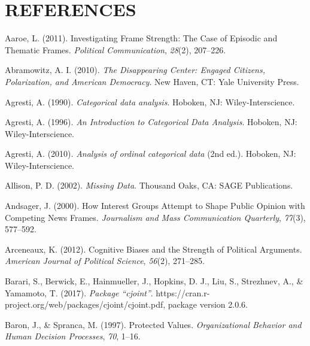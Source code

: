 \documentclass[12pt,econ]{sources/authesis}
\begin{document}
\hypertarget{references}{%
\chapter*{REFERENCES}\label{references}}

\noindent

\ssp

\hypertarget{refs}{}
\leavevmode\hypertarget{ref-aaroe_investigating_2011}{}%
Aaroe, L. (2011). Investigating Frame Strength: The Case of Episodic and Thematic Frames. \emph{Political Communication}, \emph{28}(2), 207--226.

\leavevmode\hypertarget{ref-abramowitz_disappearing_2010}{}%
Abramowitz, A. I. (2010). \emph{The Disappearing Center: Engaged Citizens, Polarization, and American Democracy}. New Haven, CT: Yale University Press.

\leavevmode\hypertarget{ref-agresti_1990_categorical}{}%
Agresti, A. (1990). \emph{Categorical data analysis}. Hoboken, NJ: Wiley-Interscience.

\leavevmode\hypertarget{ref-agresti_1996_introduction}{}%
Agresti, A. (1996). \emph{An Introduction to Categorical Data Analysis}. Hoboken, NJ: Wiley-Interscience.

\leavevmode\hypertarget{ref-agresti_2010_analysis}{}%
Agresti, A. (2010). \emph{Analysis of ordinal categorical data} (2nd ed.). Hoboken, NJ: Wiley-Interscience.

\leavevmode\hypertarget{ref-allison_2002_missing}{}%
Allison, P. D. (2002). \emph{Missing Data}. Thousand Oaks, CA: SAGE Publications.

\leavevmode\hypertarget{ref-andsager_how_2000}{}%
Andsager, J. (2000). How Interest Groups Attempt to Shape Public Opinion with Competing News Frames. \emph{Journalism and Mass Communication Quarterly}, \emph{77}(3), 577--592.

\leavevmode\hypertarget{ref-arceneaux_cognitive_2012}{}%
Arceneaux, K. (2012). Cognitive Biases and the Strength of Political Arguments. \emph{American Journal of Political Science}, \emph{56}(2), 271--285.

\leavevmode\hypertarget{ref-barari_2017_package}{}%
Barari, S., Berwick, E., Hainmueller, J., Hopkins, D. J., Liu, S., Strezhnev, A., \& Yamamoto, T. (2017). \emph{Package ``cjoint''}. https://cran.r-project.org/web/packages/cjoint/cjoint.pdf, package version 2.0.6.

\leavevmode\hypertarget{ref-baron_protected_1997}{}%
Baron, J., \& Spranca, M. (1997). Protected Values. \emph{Organizational Behavior and Human Decision Processes}, \emph{70}, 1--16.
\end{document}
